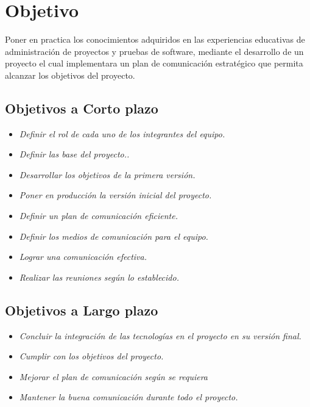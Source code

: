 \documentclass[12pt,a4paper]{article}
\date{\today}
\begin{document}


\section{Objetivo}
Poner en practica los conocimientos adquiridos en las experiencias educativas de administración de proyectos y pruebas de software, mediante el desarrollo de un proyecto el cual implementara un plan de comunicación estratégico que permita alcanzar los objetivos del proyecto.

\subsection{Objetivos a Corto plazo}
\begin{itemize}
\item \textit{Definir el rol de cada uno de los integrantes del equipo.}
\item \textit{Definir las base del proyecto..}
\item \textit{Desarrollar los objetivos de la primera versión.}
\item \textit{Poner en producción la versión inicial del proyecto.}
\item \textit{Definir un plan de comunicación eficiente.}
\item \textit{Definir los medios de comunicación para el equipo.}
\item \textit{Lograr una comunicación efectiva.}
\item \textit{Realizar las reuniones según lo establecido.}
\end{itemize}
\vspace{0.5 cm} 

\subsection{Objetivos a Largo plazo}
\begin{itemize}
\item \textit{Concluir la integración de las tecnologías en el proyecto en su versión final.}
\item \textit{Cumplir con los objetivos del proyecto.}
\item \textit{Mejorar el plan de comunicación según se requiera}
\item \textit{Mantener la buena comunicación durante todo el proyecto.}
\end{itemize}
\end{document}
